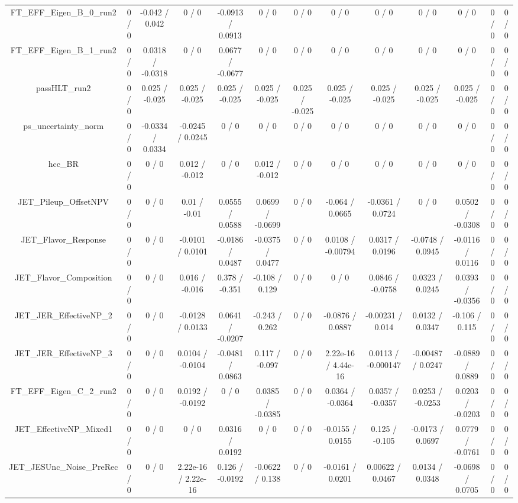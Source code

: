 \documentclass[10pt]{article}
\begin{document}
\begin{table}[htbp]
\begin{center}
\begin{tabular}{|c|c|c|c|c|c|c|c|c|c|c|c|c|}
  FT_EFF_Eigen_B_0_run2 & 0 / 0 & -0.042 / 0.042 & 0 / 0 & -0.0913 / 0.0913 & 0 / 0 & 0 / 0 & 0 / 0 & 0 / 0 & 0 / 0 & 0 / 0 & 0 / 0 & 0 / 0 \\ 
  FT_EFF_Eigen_B_1_run2 & 0 / 0 & 0.0318 / -0.0318 & 0 / 0 & 0.0677 / -0.0677 & 0 / 0 & 0 / 0 & 0 / 0 & 0 / 0 & 0 / 0 & 0 / 0 & 0 / 0 & 0 / 0 \\ 
  passHLT_run2 & 0 / 0 & 0.025 / -0.025 & 0.025 / -0.025 & 0.025 / -0.025 & 0.025 / -0.025 & 0.025 / -0.025 & 0.025 / -0.025 & 0.025 / -0.025 & 0.025 / -0.025 & 0.025 / -0.025 & 0 / 0 & 0 / 0 \\ 
  ps_uncertainty_norm & 0 / 0 & -0.0334 / 0.0334 & -0.0245 / 0.0245 & 0 / 0 & 0 / 0 & 0 / 0 & 0 / 0 & 0 / 0 & 0 / 0 & 0 / 0 & 0 / 0 & 0 / 0 \\ 
  hcc_BR & 0 / 0 & 0 / 0 & 0.012 / -0.012 & 0 / 0 & 0.012 / -0.012 & 0 / 0 & 0 / 0 & 0 / 0 & 0 / 0 & 0 / 0 & 0 / 0 & 0 / 0 \\ 
  JET_Pileup_OffsetNPV & 0 / 0 & 0 / 0 & 0.01 / -0.01 & 0.0555 / 0.0588 & 0.0699 / -0.0699 & 0 / 0 & -0.064 / 0.0665 & -0.0361 / 0.0724 & 0 / 0 & 0.0502 / -0.0308 & 0 / 0 & 0 / 0 \\ 
  JET_Flavor_Response & 0 / 0 & 0 / 0 & -0.0101 / 0.0101 & -0.0186 / 0.0487 & -0.0375 / 0.0477 & 0 / 0 & 0.0108 / -0.00794 & 0.0317 / 0.0196 & -0.0748 / 0.0945 & -0.0116 / 0.0116 & 0 / 0 & 0 / 0 \\ 
  JET_Flavor_Composition & 0 / 0 & 0 / 0 & 0.016 / -0.016 & 0.378 / -0.351 & -0.108 / 0.129 & 0 / 0 & 0 / 0 & 0.0846 / -0.0758 & 0.0323 / 0.0245 & 0.0393 / -0.0356 & 0 / 0 & 0 / 0 \\ 
  JET_JER_EffectiveNP_2 & 0 / 0 & 0 / 0 & -0.0128 / 0.0133 & 0.0641 / -0.0207 & -0.243 / 0.262 & 0 / 0 & -0.0876 / 0.0887 & -0.00231 / 0.014 & 0.0132 / 0.0347 & -0.106 / 0.115 & 0 / 0 & 0 / 0 \\ 
  JET_JER_EffectiveNP_3 & 0 / 0 & 0 / 0 & 0.0104 / -0.0104 & -0.0481 / 0.0863 & 0.117 / -0.097 & 0 / 0 & 2.22e-16 / 4.44e-16 & 0.0113 / -0.000147 & -0.00487 / 0.0247 & -0.0889 / 0.0889 & 0 / 0 & 0 / 0 \\ 
  FT_EFF_Eigen_C_2_run2 & 0 / 0 & 0 / 0 & 0.0192 / -0.0192 & 0 / 0 & 0.0385 / -0.0385 & 0 / 0 & 0.0364 / -0.0364 & 0.0357 / -0.0357 & 0.0253 / -0.0253 & 0.0203 / -0.0203 & 0 / 0 & 0 / 0 \\ 
  JET_EffectiveNP_Mixed1 & 0 / 0 & 0 / 0 & 0 / 0 & 0.0316 / 0.0192 & 0 / 0 & 0 / 0 & -0.0155 / 0.0155 & 0.125 / -0.105 & -0.0173 / 0.0697 & 0.0779 / -0.0761 & 0 / 0 & 0 / 0 \\ 
  JET_JESUnc_Noise_PreRec & 0 / 0 & 0 / 0 & 2.22e-16 / 2.22e-16 & 0.126 / -0.0192 & -0.0622 / 0.138 & 0 / 0 & -0.0161 / 0.0201 & 0.00622 / 0.0467 & 0.0134 / 0.0348 & -0.0698 / 0.0705 & 0 / 0 & 0 / 0 \\ 

\end{tabular}
\end{center}
\end{table}
\end{document}
